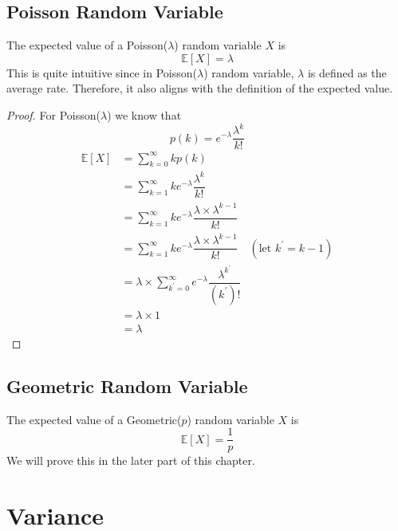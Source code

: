 \subsection{Poisson Random Variable}
The expected value of a Poisson(\(\lambda\)) random variable \(X\) is 
\[
    \mathbb{E}[X] = \lambda
\]
This is quite intuitive since in Poisson(\(\lambda\)) random variable, \(\lambda\) is defined as the average rate. Therefore, it also aligns with the definition of the expected value. 
\begin{proof}
    For Poisson(\(\lambda\)) we know that 
    \[
        p(k) = e^{-\lambda}\dfrac{\lambda^k}{k!}
    \]
    \[
        \begin{aligned}
        \mathbb{E}[X] &= \sum_{k = 0}^{\infty} kp(k) \\
        &= \sum_{k = 1}^{\infty} ke^{-\lambda}\dfrac{\lambda^k}{k!} \\
        &= \sum_{k = 1}^{\infty} ke^{-\lambda}\dfrac{\lambda \times \lambda^{k-1}}{k!} \\
        &= \sum_{k = 1}^{\infty} ke^{-\lambda}\dfrac{\lambda \times \lambda^{k-1}}{k!} \quad (\text{let } k^{\prime} = k - 1)\\
        &= \lambda \times \sum_{k^{\prime} = 0}^{\infty} e^{-\lambda}\dfrac{\lambda^{k^{\prime}}}{(k^{\prime})!}\\
        &= \lambda \times 1\\
        &= \lambda
    \end{aligned}
    \]
\end{proof}

\subsection{Geometric Random Variable}
The expected value of a Geometric(\(p\)) random variable \(X\) is 
\[
    \mathbb{E}[X] = \dfrac{1}{p}
\]
We will prove this in the later part of this chapter.

\section{Variance}

